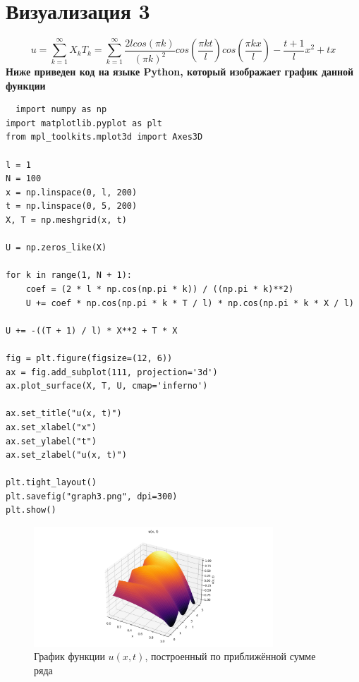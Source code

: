 \documentclass[a4paper,12pt]{article}
\begin{document}
\section{Визуализация 3}
$$u = \sum_{k=1}^{\infty}X_k T_k = \sum_{k=1}^{\infty} \frac{2l cos(\pi k)}{(\pi k)^2}cos(\frac{\pi k t}{l})cos(\frac{\pi k x}{l}) - \frac{t+1}{l}x^2 + tx$$
\textbf{Ниже приведен код на языке Python, который изображает график данной функции}
\begin{lstlisting}
  import numpy as np
import matplotlib.pyplot as plt
from mpl_toolkits.mplot3d import Axes3D

l = 1
N = 100 
x = np.linspace(0, l, 200)
t = np.linspace(0, 5, 200)
X, T = np.meshgrid(x, t)

U = np.zeros_like(X)

for k in range(1, N + 1):
    coef = (2 * l * np.cos(np.pi * k)) / ((np.pi * k)**2)
    U += coef * np.cos(np.pi * k * T / l) * np.cos(np.pi * k * X / l)

U += -((T + 1) / l) * X**2 + T * X

fig = plt.figure(figsize=(12, 6))
ax = fig.add_subplot(111, projection='3d')
ax.plot_surface(X, T, U, cmap='inferno')

ax.set_title("u(x, t)")
ax.set_xlabel("x")
ax.set_ylabel("t")
ax.set_zlabel("u(x, t)")

plt.tight_layout()
plt.savefig("graph3.png", dpi=300)
plt.show()

\end{lstlisting}
\begin{figure}[H]
    \centering
    \includegraphics[width=0.8\textwidth]{../graph3.png}
    \caption{График функции $u(x,t)$, построенный по приближённой сумме ряда}
\end{figure}
\end{document}
